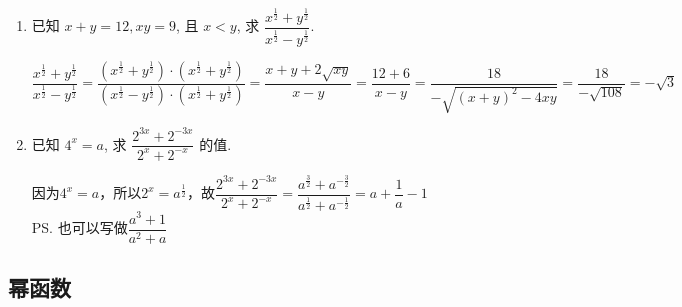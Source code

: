 \begin{enumerate}
\begin{jieda}
(2) $x^2$; 

(3) $-9a$. 
\end{jieda}


\item 已知 $x+y=12, x y=9$, 且 $x<y$, 求 $\dfrac{x^{\frac{1}{2}}+y^{\frac{1}{2}}}{x^{\frac{1}{2}}-y^{\frac{1}{2}}}$.
\begin{jieda}
    $\dfrac{x^{\frac{1}{2}}+y^{\frac{1}{2}}}{x^{\frac{1}{2}}-y^{\frac{1}{2}}} = \dfrac{\left ( x^{\frac{1}{2}}+y^{\frac{1}{2}} \right) \cdot \left ( x^{\frac{1}{2}}+y^{\frac{1}{2}} \right)}{\left ( x^{\frac{1}{2}}-y^{\frac{1}{2}} \right) \cdot \left ( x^{\frac{1}{2}}+y^{\frac{1}{2}} \right)} = \dfrac{x+y+2\sqrt{xy}}{x-y} = \dfrac{12 + 6}{x-y} = \dfrac{18}{-\sqrt{(x+y)^2-4xy}} = \dfrac{18}{-\sqrt{108}} = -\sqrt{3}$
\end{jieda}
\begin{vspace_}
\vsp[2]
\end{vspace_}

\item 已知 $4^x=a$, 求 $\dfrac{2^{3 x}+2^{-3 x}}{2^x+2^{-x}}$ 的值.
\begin{jieda}
    因为$4^x=a$，所以$2^x = a^{\frac{1}{2}}$，故$\dfrac{2^{3 x}+2^{-3 x}}{2^x+2^{-x}} = \dfrac{a^{\frac{3}{2}} + a^{-\frac{3}{2}}}{a^{\frac{1}{2}} + a^{-\frac{1}{2}}} = a + \dfrac{1}{a} - 1$ \\
    \ps 也可以写做$\dfrac{a^3+1}{a^2+a}$
\end{jieda}
\begin{vspace_}
\vsp[2]
\end{vspace_}

\end{enumerate}

\subsection{幂函数}

